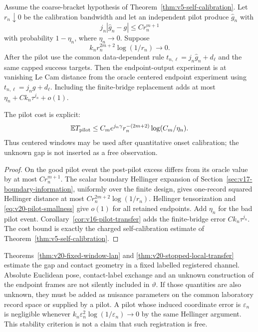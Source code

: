 \begin{corollary}
\label{cor:v20-pilot-centered}
Assume the coarse-bracket hypothesis of
Theorem~\ref{thm:v5-self-calibration}.  Let $r_n\downarrow0$ be the calibration
bandwidth and let an independent pilot produce $\widehat g_n$ with
\begin{equation}\label{eq:v20-pilot-gap}
 j_n|\widehat g_n-g|\le Cr_n^{m+1}
\end{equation}
with probability $1-\eta_n$, where $\eta_n\to0$.  Suppose
\begin{equation}\label{eq:v20-pilot-smallness}
 k_nr_n^{2m+2}\log(1/r_n)\to0.
\end{equation}
After the pilot use the common data-dependent rule
$t_{n,\ell}=j_n\widehat g_n+d_\ell$ and the same capped success targets.
Then the endpoint-output experiment is at vanishing Le Cam distance from the
oracle centered endpoint experiment using $t_{n,\ell}=j_ng+d_\ell$.
Including the finite-bridge replacement adds at most
$\eta_n+Ck_n\tau^{j_n}+o(1)$.

The pilot cost is explicit:
\begin{equation}\label{eq:v20-pilot-cost}
 \mathbb ET_{\rm pilot}
 \le C_me^{j_n\gamma}r_n^{-(2m+2)}\log(C_m/\eta_n).
\end{equation}
Thus centered windows may be used after quantitative onset calibration; the
unknown gap is not inserted as a free observation.
\end{corollary}

\begin{proof}
On the good pilot event the post-pilot excess differs from its oracle value by
at most $Cr_n^{m+1}$.  The scalar boundary Hellinger expansion of
Section~\ref{sec:v17-boundary-information}, uniformly over the finite design,
gives one-record squared Hellinger distance at most
$Cr_n^{2m+2}\log(1/r_n)$.  Hellinger tensorization and
\eqref{eq:v20-pilot-smallness} give $o(1)$ for all retained endpoints.  Add
$\eta_n$ for the bad pilot event.  Corollary~\ref{cor:v16-pilot-transfer}
adds the finite-bridge error $Ck_n\tau^{j_n}$.  The cost bound is exactly the
charged self-calibration estimate of Theorem~\ref{thm:v5-self-calibration}.
\end{proof}

\begin{remark}
Theorems~\ref{thm:v20-fixed-window-lan} and
\ref{thm:v20-stopped-local-transfer} estimate the gap and contact geometry in
a fixed labelled registered channel.  Absolute Euclidean pose, contact-label
exchange and an unknown construction of the endpoint frames are not silently
included in $\vartheta$.  If those quantities are also unknown, they must be
added as nuisance parameters on the common laboratory record space or supplied
by a pilot.  A pilot whose induced coordinate error is $\varepsilon_n$ is
negligible whenever
$k_n\varepsilon_n^2\log(1/\varepsilon_n)\to0$ by the same Hellinger
argument.  This stability criterion is not a claim that such registration is
free.
\end{remark}
